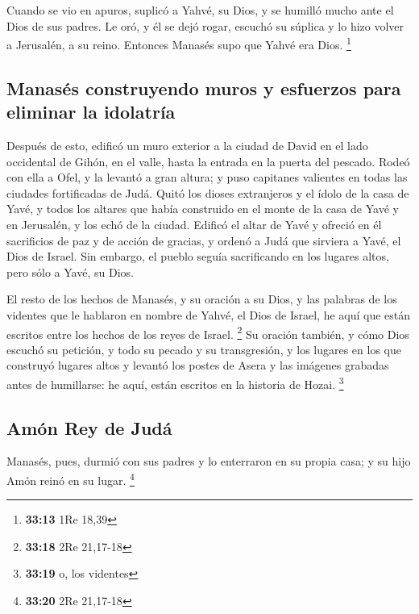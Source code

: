 \begin{paracol}{2}
 Cuando se vio en apuros, suplicó a Yahvé, su Dios, y se
humilló mucho ante el Dios de sus padres.  Le oró, y él
se dejó rogar, escuchó su súplica y lo hizo volver a Jerusalén, a su
reino. Entonces Manasés supo que Yahvé era Dios. \footnote{\textbf{33:13}
  1Re 18,39}

\hypertarget{manasuxe9s-construyendo-muros-y-esfuerzos-para-eliminar-la-idolatruxeda}{%
\subsection{Manasés construyendo muros y esfuerzos para eliminar la
idolatría}\label{manasuxe9s-construyendo-muros-y-esfuerzos-para-eliminar-la-idolatruxeda}}

 Después de esto, edificó un muro exterior a la ciudad de
David en el lado occidental de Gihón, en el valle, hasta la entrada en
la puerta del pescado. Rodeó con ella a Ofel, y la levantó a gran
altura; y puso capitanes valientes en todas las ciudades fortificadas de
Judá.  Quitó los dioses extranjeros y el ídolo de la casa
de Yavé, y todos los altares que había construido en el monte de la casa
de Yavé y en Jerusalén, y los echó de la ciudad.  Edificó
el altar de Yavé y ofreció en él sacrificios de paz y de acción de
gracias, y ordenó a Judá que sirviera a Yavé, el Dios de Israel.
 Sin embargo, el pueblo seguía sacrificando en los
lugares altos, pero sólo a Yavé, su Dios.

 El resto de los hechos de Manasés, y su oración a su
Dios, y las palabras de los videntes que le hablaron en nombre de Yahvé,
el Dios de Israel, he aquí que están escritos entre los hechos de los
reyes de Israel. \footnote{\textbf{33:18} 2Re 21,17-18} 
Su oración también, y cómo Dios escuchó su petición, y todo su pecado y
su transgresión, y los lugares en los que construyó lugares altos y
levantó los postes de Asera y las imágenes grabadas antes de humillarse:
he aquí, están escritos en la historia de Hozai. \footnote{\textbf{33:19}
  o, los videntes}

\hypertarget{amuxf3n-rey-de-juduxe1}{%
\subsection{Amón Rey de Judá}\label{amuxf3n-rey-de-juduxe1}}

 Manasés, pues, durmió con sus padres y lo enterraron en
su propia casa; y su hijo Amón reinó en su lugar. \footnote{\textbf{33:20}
  2Re 21,17-18}


\end{paracol}
